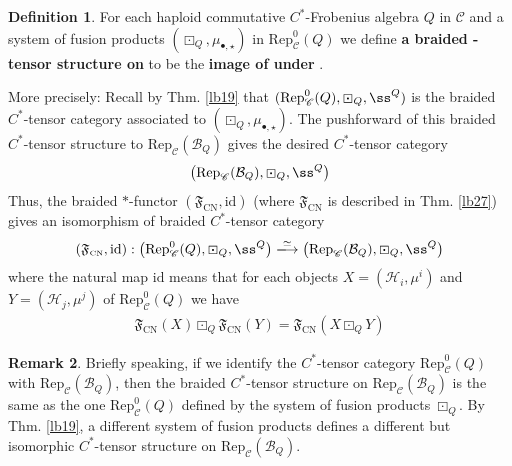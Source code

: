 \documentclass[11pt,b5paper,notitlepage]{article}
\theoremstyle{definition}
\newtheorem{df}{Definition}[section]
\newtheorem{rem}[df]{Remark}
\newtheorem{cv}[df]{Convention}
\theoremstyle{plain}
\newcommand{\fk}{\mathfrak}
\newcommand{\mc}{\mathcal}
\newcommand{\id}{\mathrm{id}}
\newcommand{\Rep}{\mathrm{Rep}}
\newcommand{\scr}{\mathscr}
\newcommand{\blt}{\bullet}
\newcommand{\CN}{{\scriptscriptstyle \mathrm{CN}}}
\numberwithin{equation}{section}
\begin{document}
\begin{df}\label{lb70}
For each haploid commutative $C^*$-Frobenius algebra $Q$ in $\scr C$ and a system of fusion products $(\boxdot_Q,\mu_{\blt,\star})$ in $\Rep^0_{\scr C}(Q)$ we define \textbf{a braided -tensor structure on} \pmb{$\Rep_{\scr C}(\mc B_Q)$} to be the \textbf{image of \pmb{$\Rep^0_{\scr C}(Q)$} under \pmb{$(\fk F_\CN,\id)$}}. 

More precisely: Recall by Thm. \ref{lb19} that $(\Rep^0_{\scr C}(Q),\boxdot_Q,\ss^Q)$ is the braided $C^*$-tensor category associated to $(\boxdot_Q,\mu_{\blt,\star})$. The pushforward of this braided $C^*$-tensor structure to $\Rep_{\scr C}(\mc B_Q)$ gives the desired $C^*$-tensor category
\begin{align*}
\big(\Rep_{\scr C}(\mc B_Q),\boxdot_Q,\ss^Q\big)
\end{align*}
Thus, the braided $*$-functor $(\fk F_\CN,\id)$ (where $\fk F_\CN$ is described in Thm. \ref{lb27}) gives an isomorphism of braided $C^*$-tensor category
\begin{align*}
(\fk F_\CN,\id): \big(\Rep^0_{\scr C}(Q),\boxdot_Q,\ss^Q\big)\xlongrightarrow{\simeq}\big(\Rep_{\scr C}(\mc B_Q),\boxdot_Q,\ss^Q\big)
\end{align*}
where the natural map $\id$ means that for each objects $X=(\mc H_i,\mu^i)$ and $Y=(\mc H_j,\mu^j)$ of $\Rep_{\scr C}^0(Q)$ we have
\begin{align*}
\fk F_\CN(X)\boxdot_Q \fk F_\CN(Y)=\fk F_\CN(X\boxdot_Q Y)
\end{align*}
\end{df}


\begin{rem}
Briefly speaking, if we identify the $C^*$-tensor category $\Rep_{\scr C}^0(Q)$ with $\Rep_{\scr C}(\mc B_Q)$, then the braided $C^*$-tensor structure on $\Rep_{\scr C}(\mc B_Q)$ is the same as the one $\Rep_{\scr C}^0(Q)$ defined by the system of fusion products $\boxdot_Q$. By Thm. \ref{lb19}, a different system of fusion products defines a different but isomorphic $C^*$-tensor structure on $\Rep_{\scr C}(\mc B_Q)$.
\end{rem}

\begin{comment}
\begin{cv}
To simplify the following discussions, we identify the two braided $C^*$-tensor categories via $\fk F_\CN$ so that we have an equality
\begin{align*}
\tcboxmath{\big(\Rep^0_{\scr C}(Q),\boxdot_Q,\ss^Q\big)=\big(\Rep_{\scr C}(\mc B_Q),\boxdot_Q,\ss^Q\big)}
\end{align*}
\end{cv}
\end{comment}
\end{document}
